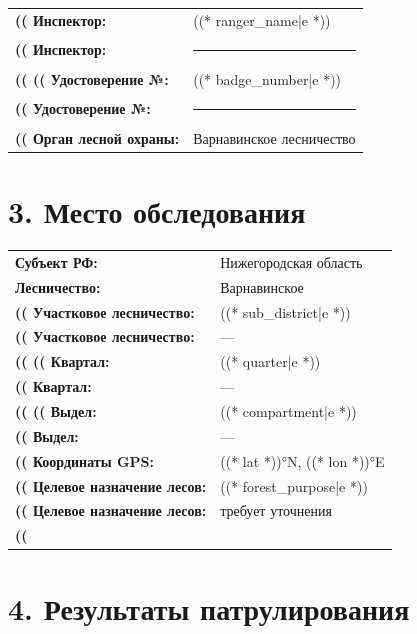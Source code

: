 \documentclass[12pt, a4paper]{article}
\begin{document}
\noindent
\begin{tabularx}{\textwidth}{@{}>{\bfseries}p{5.5cm}X@{}}
((%
    Инспектор: & ((* ranger_name|e *)) \\[3pt]
((%
    Инспектор: & \rule{8cm}{0.4pt} \\[3pt]
((%
((%
    Удостоверение №: & ((* badge_number|e *)) \\[3pt]
((%
    Удостоверение №: & \rule{5cm}{0.4pt} \\[3pt]
((%
    Орган лесной охраны: & Варнавинское лесничество \\
\end{tabularx}

\section{3. Место обследования}

\noindent
\begin{tabularx}{\textwidth}{@{}>{\bfseries}p{5.5cm}X@{}}
    Субъект РФ: & Нижегородская область \\[3pt]
    Лесничество: & Варнавинское \\[3pt]
((%
    Участковое лесничество: & ((* sub_district|e *)) \\[3pt]
((%
    Участковое лесничество: & --- \\[3pt]
((%
((%
    Квартал: & ((* quarter|e *)) \\[3pt]
((%
    Квартал: & --- \\[3pt]
((%
((%
    Выдел: & ((* compartment|e *)) \\[3pt]
((%
    Выдел: & --- \\[3pt]
((%
    Координаты GPS: & ((* lat *))°N, ((* lon *))°E \\[3pt]
((%
    Целевое назначение лесов: & ((* forest_purpose|e *)) \\
((%
    Целевое назначение лесов: & требует уточнения \\
((%
\end{tabularx}

\section{4. Результаты патрулирования}
\end{document}
